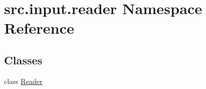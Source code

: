 \hypertarget{namespacesrc_1_1input_1_1reader}{\section{src.\+input.\+reader Namespace Reference}
\label{namespacesrc_1_1input_1_1reader}
}
\subsection*{Classes}
\begin{DoxyCompactItemize}
\item 
class \hyperlink{classsrc_1_1input_1_1reader_1_1_reader}{Reader}
\end{DoxyCompactItemize}
